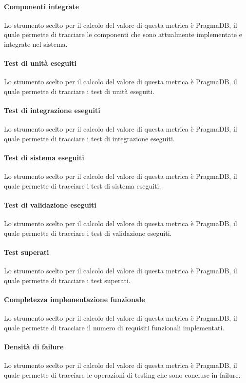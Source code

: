 \paragraph{Componenti integrate}
Lo strumento scelto per il calcolo del valore di questa metrica è PragmaDB, il quale permette di tracciare le componenti che sono attualmente implementate e integrate nel sistema.
\paragraph{Test di unità eseguiti}
Lo strumento scelto per il calcolo del valore di questa metrica è PragmaDB, il quale permette di tracciare i test di unità eseguiti.
\paragraph{Test di integrazione eseguiti}
Lo strumento scelto per il calcolo del valore di questa metrica è PragmaDB, il quale permette di tracciare i test di integrazione eseguiti.
\paragraph{Test di sistema eseguiti}
Lo strumento scelto per il calcolo del valore di questa metrica è PragmaDB, il quale permette di tracciare i test di sistema eseguiti.
\paragraph{Test di validazione eseguiti}
Lo strumento scelto per il calcolo del valore di questa metrica è PragmaDB, il quale permette di tracciare i test di validazione eseguiti.
\paragraph{Test superati}
Lo strumento scelto per il calcolo del valore di questa metrica è PragmaDB, il quale permette di tracciare i test superati.
\paragraph{Completezza implementazione funzionale}
Lo strumento scelto per il calcolo del valore di questa metrica è PragmaDB, il quale permette di tracciare il numero di requisiti funzionali implementati.
\paragraph{Densità di failure}
Lo strumento scelto per il calcolo del valore di questa metrica è PragmaDB, il quale permette di tracciare le operazioni di testing che sono concluse in failure.

